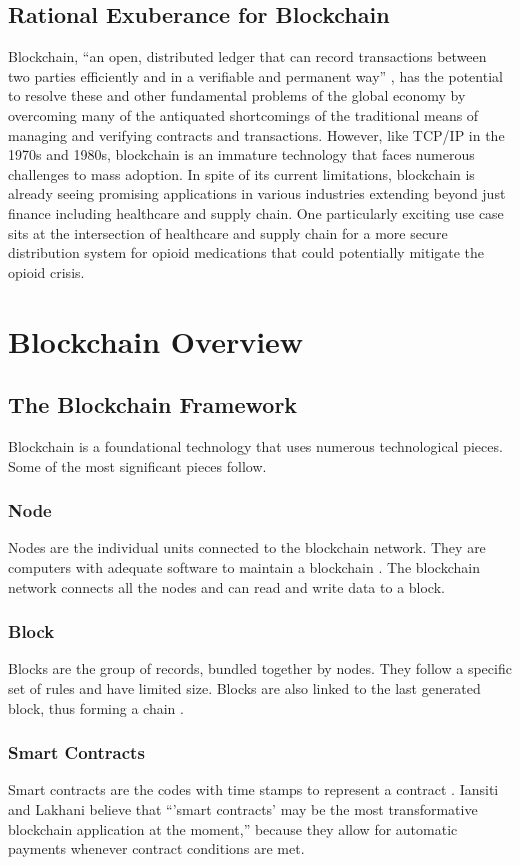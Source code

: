 \documentclass[sigconf]{acmart}
\begin{document}
\subsection{Rational Exuberance for Blockchain}
Blockchain, ``an open, distributed ledger that can record transactions between two parties efficiently and in a verifiable and permanent way'' \cite{hbr}, has the potential to resolve these and other fundamental problems of the global economy by overcoming many of the antiquated shortcomings of the traditional means of managing and verifying contracts and transactions. However, like TCP/IP in the 1970s and 1980s, blockchain is an immature technology that faces numerous challenges to mass adoption. In spite of its current limitations, blockchain is already seeing promising applications in various industries extending beyond just finance including healthcare and supply chain. One particularly exciting use case sits at the intersection of healthcare and supply chain for a more secure distribution system for opioid medications that could potentially mitigate the opioid crisis.

\section{Blockchain Overview}
\subsection{The Blockchain Framework}
Blockchain is a foundational technology that uses numerous technological pieces. Some of the most significant pieces follow.

\subsubsection{Node} Nodes are the individual units connected to the blockchain network. They are computers with adequate software to maintain a blockchain \cite{pabc1} \cite{pabc2}. The blockchain network connects all the nodes and can read and write data to a block.

\subsubsection{Block} Blocks are the group of records, bundled together by nodes. They follow a specific set of rules and have limited size. Blocks are also linked to the last generated block, thus forming a chain \cite{pabc1}.

\subsubsection{Smart Contracts} Smart contracts are the codes with time stamps to represent a contract \cite{pabc1}. Iansiti and Lakhani \cite{hbr} believe that ``'smart contracts' may be the most transformative blockchain application at the moment,'' because they allow for automatic payments whenever contract conditions are met. 
\end{document}
